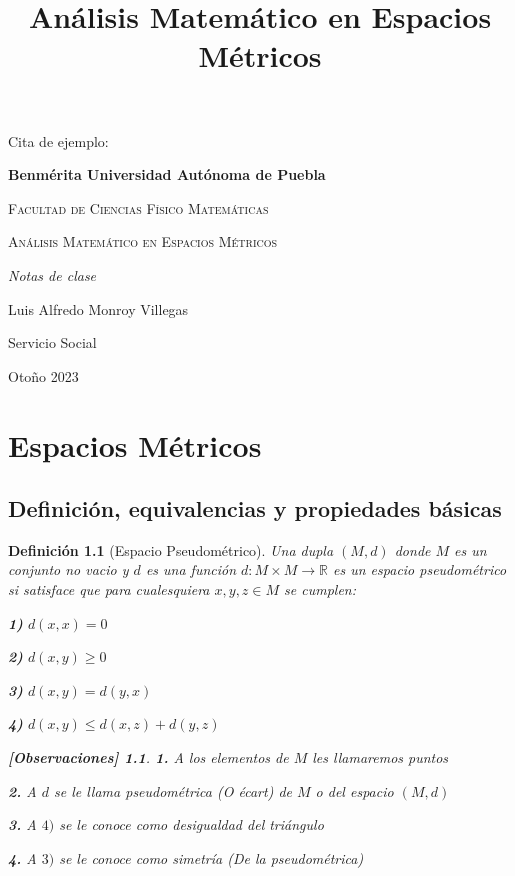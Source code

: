 \documentclass[oneside]{book} %
\theoremstyle{Teorema}
\newtheorem{Definicion}{Definición}[chapter]
\theoremstyle{Ejemplos}
\theoremstyle{[Obs]}
\newtheorem*{Obs}{[Observaciones]}
\renewcommand{\{}{\left\lbrace} %
\renewcommand{\}}{\right\rbrace} %
\newcommand{\R}{\mathbb{R}} %
\begin{document}
	\color{white} 
	Cita de ejemplo: \cite{DUMMY:1}
	\color{black} \newpage

	\begin{titlepage}
		\centering
		{\bfseries\LARGE Benmérita Universidad Autónoma de Puebla \par}
		\vspace{1cm}
		{\scshape\Large Facultad de Ciencias Físico Matemáticas \par}
		\vspace{3cm}
		{\scshape\Huge Análisis Matemático en Espacios Métricos \par}
		\vspace{3cm}
		{\itshape\Large Notas de clase \par}
		\vfill
		{\Large Luis Alfredo Monroy Villegas \par}
		{\Large Servicio Social \par}
		\vfill
		{\Large Otoño 2023 \par}
	\end{titlepage}

	\tableofcontents
	\justify
	\title{Análisis Matemático en Espacios Métricos}

	\chapter{Espacios Métricos}

		\section{Definición, equivalencias y propiedades básicas}

			\begin{Definicion}[Espacio Pseudométrico]\setlength{\parindent}{0em}
				
				Una dupla $(M, d)$ donde $M$ es un conjunto no vacio y $d$ es una función $d : M \times M \to \R$ es un espacio pseudométrico si satisface que para cualesquiera $x, y, z \in M$ se cumplen: 

				\textbf{1)} $d(x, x) = 0$ 

				\textbf{2)} $d(x, y) \geq 0$ 

				\textbf{3)} $d(x, y) = d(y, x)$ 

				\textbf{4)} $d(x, y) \leq d(x, z) + d(y, z)$ 

				\begin{Obs}
				
					\textbf{1.} A los elementos de $M$ les llamaremos puntos

					\textbf{2.} A $d$ se le llama pseudométrica (O écart) de $M$ o del espacio $(M, d)$

					\textbf{3.} A \textbf{$4)$} se le conoce como desigualdad del triángulo

					\textbf{4.} A \textbf{$3)$} se le conoce como simetría (De la pseudométrica)
				
				\end{Obs}

			\end{Definicion}
\end{document}
